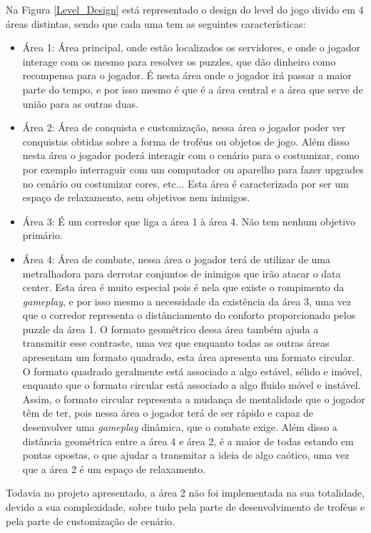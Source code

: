 Na Figura \ref{Level_Design} está representado o design do level do jogo divido em
4 áreas distintas, sendo que cada uma tem as seguintes características:
\begin{itemize}
    \item Área 1: Área principal, onde estão localizados os servidores, e onde o jogador interage com os mesmo para resolver os puzzles, que dão dinheiro como recompensa para o jogador. É nesta área onde o jogador irá passar a maior parte do tempo, e por isso mesmo é que é a área central e a área que serve de união para as outras duas.
    \item Área 2: Área de conquista e customização, nessa área o jogador poder ver conquistas obtidas sobre a forma de troféus ou objetos de jogo. Além disso nesta área o jogador poderá interagir com o cenário para o costumizar, como por exemplo interraguir com um computador ou aparelho para fazer upgrades no cenário ou costumizar cores, etc... Esta área é caracterizada por ser um espaço de relaxamento, sem objetivos nem inimigos.
    \item Área 3: É um corredor que liga a área 1 à área 4. Não tem nenhum objetivo primário.
    \item Área 4: Área de combate, nessa área o jogador terá de utilizar de uma metralhadora para derrotar conjuntos de inimigos que irão atacar o data center. Esta área é muito especial pois é nela que existe o rompimento da \textit{gameplay}, e por isso mesmo a necessidade da existência da área 3, uma vez que o corredor representa o distânciamento do conforto proporcionado pelos puzzle da área 1. O formato geométrico dessa área também ajuda a transmitir esse contraste, uma vez que enquanto todas as outras áreas apresentam um formato quadrado, esta área apresenta um formato circular. O formato quadrado geralmente está associado a algo estável, sélido e imóvel, enquanto que o formato circular está associado a algo fluido móvel e instável. Assim, o formato circular representa a mudança de mentalidade que o jogador têm de ter, pois nessa área o jogador terá de ser rápido e capaz de desenvolver uma \textit{gameplay} dinâmica, que o combate exige. Além disso a distância geométrica entre a área 4 e área 2, é a maior de todas estando em pontas opostas, o que ajudar a transmitar a ideia de algo caótico, uma vez que a área 2 é um espaço de relaxamento.
\end{itemize}

Todavia no projeto apresentado, a área 2 não foi implementada na sua totalidade, devido a sua complexidade,
sobre tudo pela parte de desenvolvimento de troféus e pela parte de customização de cenário.

